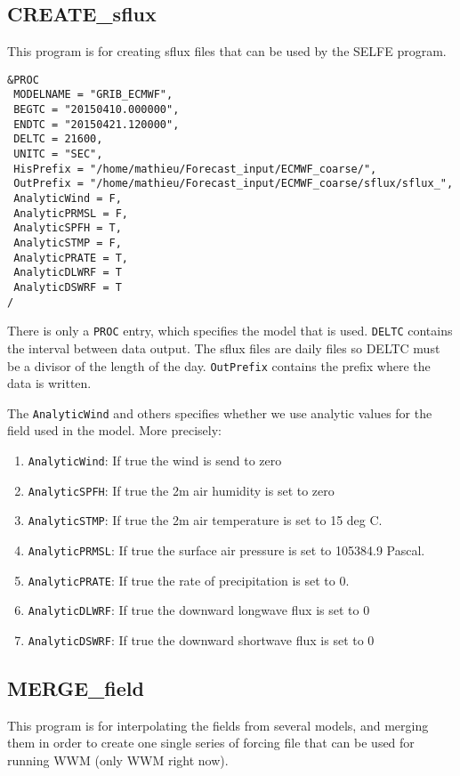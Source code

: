 \documentclass[12pt]{amsart}
\begin{document}
\subsection{CREATE\_sflux}

This program is for creating sflux files that can be used by the SELFE program.
\begin{verbatim}
&PROC
 MODELNAME = "GRIB_ECMWF", 
 BEGTC = "20150410.000000",
 ENDTC = "20150421.120000",
 DELTC = 21600, 
 UNITC = "SEC", 
 HisPrefix = "/home/mathieu/Forecast_input/ECMWF_coarse/", 
 OutPrefix = "/home/mathieu/Forecast_input/ECMWF_coarse/sflux/sflux_", 
 AnalyticWind = F,
 AnalyticPRMSL = F,
 AnalyticSPFH = T,
 AnalyticSTMP = F,
 AnalyticPRATE = T,
 AnalyticDLWRF = T
 AnalyticDSWRF = T
/
\end{verbatim}
There is only a {\tt PROC} entry, which specifies the model that is used. {\tt DELTC} contains the interval between data output. The sflux files are daily files so DELTC must be a divisor of the length of the day.
{\tt OutPrefix} contains the prefix where the data is written.

The {\tt AnalyticWind} and others specifies whether we use analytic values for the field used in the model.
More precisely:
\begin{enumerate}
\item {\tt AnalyticWind}: If true the wind is send to zero
\item {\tt AnalyticSPFH}: If true the 2m air humidity is set to zero
\item {\tt AnalyticSTMP}: If true the 2m air temperature is set to 15 deg C.
\item {\tt AnalyticPRMSL}: If true the surface air pressure is set to 105384.9 Pascal.
\item {\tt AnalyticPRATE}: If true the rate of precipitation is set to 0.
\item {\tt AnalyticDLWRF}: If true the downward longwave flux is set to 0
\item {\tt AnalyticDSWRF}: If true the downward shortwave flux is set to 0
\end{enumerate}



\subsection{MERGE\_field}

This program is for interpolating the fields from several models, and merging them in order to
create one single series of forcing file that can be used for running WWM (only WWM right now).
\end{document}

